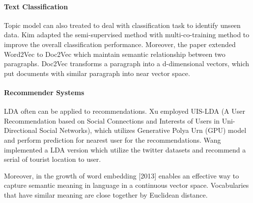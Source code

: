 \paragraph{Text Classification}Topic model can also treated to deal with classification task to identify unseen data. Kim \cite{kim_multi-co-training_2019} adapted the semi-supervised method with multi-co-training method to improve the overall classification performance. Moreover, the paper extended Word2Vec to Doc2Vec which maintain semantic relationship between two paragraphs. Doc2Vec transforms a paragraph into a d-dimensional vectors, which put documents with similar paragraph into near vector space.
\paragraph{Recommender Systems} LDA often can be applied to recommendations. Xu\cite{xu_uis-lda_2017} employed UIS-LDA (A User Recommendation based on Social Connections and Interests of Users in Uni-Directional Social Networks), which utilizes Generative Polya Urn (GPU) model and perform prediction for nearest user for the recommendations. Wang \cite{wang_st-sage_2017} implemented a LDA version which utilize the twitter datasets and recommend a serial of tourist location to user.

Moreover, in the growth of word embedding [2013] enables an effective way to capture semantic meaning in language in a continuous vector space. Vocabularies that have similar meaning are close together by Euclidean distance. 
